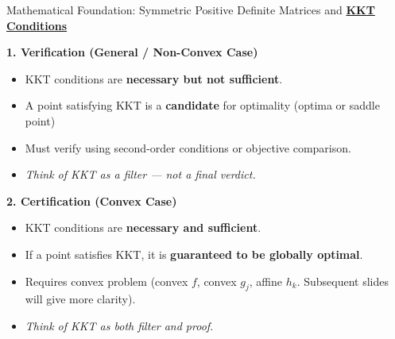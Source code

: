 \documentclass{beamer}
\begin{document}
\begin{frame}{{Mathematical Foundation: Symmetric Positive Definite Matrices and \textbf{\underline{KKT Conditions}}}}

    \textbf{1. Verification (General / Non-Convex Case)}
    \begin{itemize}
        \item KKT conditions are \textbf{necessary but not sufficient}.
        \item A point satisfying KKT is a \textbf{candidate} for optimality (optima or saddle point)
        \item Must verify using second-order conditions or objective comparison.
        \item \textit{Think of KKT as a filter — not a final verdict.}
    \end{itemize}
    
    \medskip
    
    \textbf{2. Certification (Convex Case)}
    \begin{itemize}
        \item KKT conditions are \textbf{necessary and sufficient}.
        \item If a point satisfies KKT, it is \textbf{guaranteed to be globally optimal}.
        \item Requires convex problem (convex $f$, convex $g_j$, affine $h_k$. Subsequent slides will give more clarity).
        \item \textit{Think of KKT as both filter and proof.}
    \end{itemize}

\end{frame}
\end{document}
